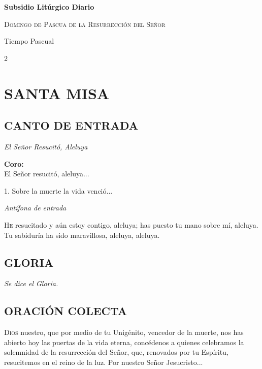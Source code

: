 \documentclass[11pt, letterpaper, twoside]{article}
\newcommand{\rubrica}[1]{\textcolor{rubricred}{\small\textit{#1}}}
\begin{document}
\begin{center}
    {\Huge\textbf{Subsidio Litúrgico Diario}\par}
    \vspace{0.3cm}
    {\large\textsc{Domingo de Pascua de la Resurrección del Señor}\par}
    {\small Tiempo Pascual\par}
\end{center}

\vspace{0.8cm}

\begin{multicols}{2}
\RaggedRight


\section*{SANTA MISA}

\subsection*{CANTO DE ENTRADA}
\noindent\rubrica{El Señor Resucitó, Aleluya} \par\vspace{0.1cm}
\textbf{Coro:} \\ 
El Señor resucitó, aleluya...

1. Sobre la muerte la vida venció...
\par\vspace{0.3cm}

\noindent\rubrica{Antífona de entrada} \par
\lettrine{H}{e} resucitado y aún estoy contigo, aleluya; has puesto tu mano sobre mí, aleluya. Tu sabiduría ha sido maravillosa, aleluya, aleluya.

\subsection*{GLORIA}
\noindent\rubrica{Se dice el Gloria.} \par\vspace{0.3cm}

\subsection*{ORACIÓN COLECTA}
\lettrine{D}{ios} nuestro, que por medio de tu Unigénito, vencedor de la muerte, nos has abierto hoy las puertas de la vida eterna, concédenos a quienes celebramos la solemnidad de la resurrección del Señor, que, renovados por tu Espíritu, resucitemos en el reino de la luz. Por nuestro Señor Jesucristo...


\end{multicols}
\end{document}
